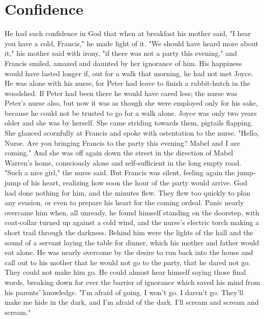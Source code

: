 \documentclass{report}
\begin{document}
	\chapter{Confidence}

He had such confidence in God that when at breakfast his mother said, "I hear
you have a cold, Francis," he made light of it. "We should have heard more about
it," his mother said with irony, "if there was not a party this evening," and
Francis smiled, amazed and daunted by her ignorance of him.
His happiness would have lasted longer if, out for a walk that morning, he had
not met Joyce. He was alone with his nurse, for Peter had leave to finish a
rabbit-hutch in the woodshed. If Peter had been there he would have cared less;
the nurse was Peter's nurse also, but now it was as though she were employed
only for his sake, because he could not be trusted to go for a walk alone. Joyce
was only two years older and she was by herself.
She came striding towards them, pigtails flapping. She glanced scornfully at
Francis and spoke with ostentation to the nurse. "Hello, Nurse. Are you bringing
Francis to the party this evening? Mabel and I are coming." And she was off
again down the street in the direction of Mabel Warren's home, consciously alone
and self-sufficient in the long empty road.
"Such a nice girl," the nurse said. But Francis was silent, feeling again the
jump-jump of his heart, realizing how soon the hour of the party would arrive.
God had done nothing for him, and the minutes flew.
They flew too quickly to plan any evasion, or even to prepare his heart for the
coming ordeal. Panic nearly overcame him when, all unready, he found himself
standing on the doorstep, with coat-collar turned up against a cold wind, and
the nurse's electric torch making a short trail through the darkness. Behind him
were the lights of the hall and the sound of a servant laying the table for
dinner, which his mother and father would eat alone. He was nearly overcome by
the desire to run back into the house and call out to his mother that he would
not go to the party, that he dared not go. They could not make him go. He could
almost hear himself saying those final words, breaking down for ever the barrier
of ignorance which saved his mind from his parents' knowledge. "I'm afraid of
going. I won't go. I daren't go. They'll make me hide in the dark, and I'm
afraid of the dark. I'll scream and scream and scream."
 
\end{document}
